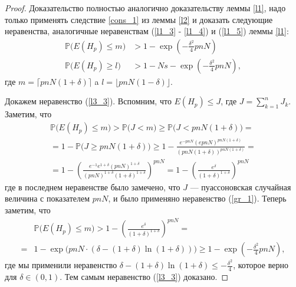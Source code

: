 \documentclass[10pt]{article}
\newcommand{\PRob}{\mathbb P}
\newcommand{\leqs}{\leqslant}
\newcommand{\geqs}{\geqslant}
\theoremstyle{named}
\begin{document}
\begin{proof}
Доказательство полностью аналогично доказательству леммы \ref{l1}, надо только применять следствие \ref{cons_1} из леммы \ref{l2}
и доказать следующие неравенства, 
аналогичные неравенствам (\ref{l1_3} - \ref{l1_4}) и (\ref{l1_5}) леммы \ref{l1}:
\begin{align} \label{l3_3}
\PRob\big( E(H_p) \leqs m \big) &> 1 - \exp\left(-\frac{\delta^2}{4}pnN\right)
\\ \label{l3_4}
\PRob\big( E(H_p) \geqs l \big) &> 1 - Ns - \exp\left(-\frac{\delta^2}{4}pnN\right),
\end{align}
где $m = \lceil pnN(1+\delta) \rceil$ a  $l = \lfloor pnN(1-\delta) \rfloor$.

Докажем неравенство (\ref{l3_3}). Вспомним, что $E(H_p) \leqs J$, где $J = \sum\limits_{k = 1}^n J_k$. Заметим, что
\begin{equation}\label{l3_5}\begin{aligned}
\PRob\big( E(H_p) \leqs m \big) > \PRob\big( J < m \big) \geqs \PRob\big( J < pnN(1+\delta) \big) 
=
\\
= 
1 - \PRob\big( J \geqs pnN(1+\delta) \big) \geqs 1 - \frac{e^{-pnN}(epnN)^{pnN(1+\delta)}}{(pnN(1+\delta))^{pnN(1+\delta)}}
=
\\
=
1 - \left( \frac{e^{-1} e^{1+\delta}(pnN)^{1+\delta}}{(pnN)^{1+\delta}(1+\delta)^{1+\delta}} \right)^{pnN}
=
1 - \left( \frac{e^\delta}{(1+\delta)^{1+\delta}} \right)^{pnN}
\end{aligned}\end{equation}
где в последнем неравенстве было замечено, что $J$ --- пуассоновская случайная величина с показателем $pnN$, 
и было применяно неравенство (\ref{gr_1}).
Теперь заметим, что 
\begin{equation}\begin{aligned}
&\PRob\big( E(H_p) \leqs m \big) > 1 - \left( \frac{e^\delta}{(1+\delta)^{1+\delta}} \right)^{pnN}
=
\\
=
&1 - \exp\big(pnN \cdot (\delta - (1+\delta) \ln(1+\delta)) \big)
\geqs
 1 - \exp\left(-\frac{\delta^2}{4}pnN\right),
\end{aligned}\end{equation}
где мы применили неравенство $\delta - (1+\delta) \ln(1+\delta) \leqs - \frac{\delta^2}{4}$, 
которое верно для $\delta \in (0,1)$. Тем самым неравенство (\ref{l3_3}) доказано.


\end{proof}
\end{document}
